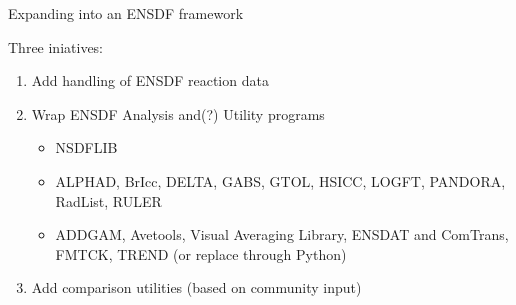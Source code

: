 \documentclass[xcolor=x11names,compress]{beamer}
\renewcommand{\(}{\begin{columns}}
\renewcommand{\)}{\end{columns}}
\newcommand{\<}[1]{\begin{column}{#1}}
\renewcommand{\>}{\end{column}}
\begin{document}
\begin{frame}{Expanding into an ENSDF framework}

    Three iniatives:
    \vspace*{1 em}
    \begin{enumerate}
      \item Add handling of ENSDF \alert{reaction} data
       
      \item Wrap ENSDF \alert{Analysis} and(?) \alert{Utility} programs
      \begin{itemize}
        \item NSDFLIB
        \item ALPHAD, BrIcc, DELTA, GABS, GTOL, HSICC, LOGFT, PANDORA,
        RadList, RULER
        \item ADDGAM, Avetools, Visual Averaging Library, ENSDAT and 
        ComTrans, FMTCK, TREND (or replace through Python)
      \end{itemize}
        
      \item Add comparison utilities (based on \alert{community input})
    \end{enumerate}
    
\end{frame}
\end{document}

